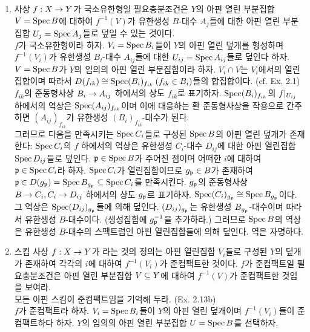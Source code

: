 	
	\begin{enumerate}[label=\tb{3.\arabic*.},itemindent=0mm,itemsep=4mm]
	\item 사상 $f:X\rightarrow Y$가 국소유한형일 필요충분조건은 $Y$의  아핀 열린 부분집합 $V=\operatorname{Spec} B$에 대하여
	$f^{-1}(V)$가 유한생성 $B$-대수 $A_j$들에 대한 아핀 열린 부분집합 $U_j=\operatorname{Spec} A_j$들로 덮일 수 있는 것이다.\\
	\sol $f$가 국소유한형이라 하자.
	$V_i=\operatorname{Spec} B_i$들이 $Y$의 아핀 열린 덮개를 형성하며 $f^{-1}(V_i)$가 유한생성 $B_i$-대수 $A_{ij}$들에 대한
	$U_{ij}=\operatorname{Spec} A_{ij}$들로 덮인다 하자. $V=\operatorname{Spec} B$가 $Y$의 임의의 아핀 열린 부분집합이라 하자.
	$V_i\cap V$는 $V_i$에서의 열린집합이며 따라서 $D(f_{ik})\cong\operatorname{Spec}(B_i)_{f_{ik}}\:(f_{ik}\in B_i)$들의 합집합이다.
	(cf. Ex. 2.1) $f_{ik}$의 준동형사상 $B_i\rightarrow A_{ij}$ 하에서의 상도 $f_{ik}$로 표기하자.
	$\operatorname{Spec}(B_i)_{f_{ik}}$의 $f|_{U_{ij}}$ 하에서의 역상은 $\operatorname{Spec}(A_{ij})_{f_{ik}}$이며
	이에 대응하는 환 준동형사상을 작용으로 간주하면 $(A_{ij})_{f_{ik}}$가 유한생성 $(B_i)_{f_{ik}}$-대수가 된다.\\
	그러므로 다음을 만족시키는 $\operatorname{Spec} C_i$들로 구성된 $\operatorname{Spec} B$의 아핀 열린 덮개가 존재한다:
	$\operatorname{Spec} C_i$의 $f$ 하에서의 역상은 유한생성 $C_i$-대수 $D_{ij}$에 대한 아핀 열린집합 $\operatorname{Spec} D_{ij}$들로 덮인다.
	$\mathfrak{p}\in\operatorname{Spec} B$가 주어진 점이며 어떠한 $i$에 대하여 $\mathfrak{p}\in\operatorname{Spec} C_i$라 하자.
	$\operatorname{Spec} C_i$가 열린집합이므로 $g_{\mathfrak{p}}\in B$가 존재하여
	$\mathfrak{p}\in D(g_{\mathfrak{p}})=\operatorname{Spec} B_{g_{\mathfrak{p}}}\subseteq\operatorname{Spec} C_i$를 만족시킨다.
	$g_{\mathfrak{p}}$의 준동형사상 $B\rightarrow C_i,C_i\rightarrow D_{ij}$ 하에서의 상도 $g_{\mathfrak{p}}$로 표기하자.
	$\operatorname{Spec}(C_i)_{g_{\mathfrak{p}}}\cong\operatorname{Spec} B_{g_{\mathfrak{p}}}$이다. 그 역상은 $\operatorname{Spec}(D_{ij})_{g_{\mathfrak{p}}}$들에 의해 덮인다.
	$(D_{ij})_{g_{\mathfrak{p}}}$는 유한생성 $B_{g_{\mathfrak{p}}}$-대수이며 따라서 유한생성 $B$-대수이다.
	(생성집합에 $g_{\mathfrak{p}}^{-1}$을 추가하라.)
	그러므로 $\operatorname{Spec} B$의 역상은 유한생성 $B$-대수의 스펙트럼인 아핀 열린집합들에 의해 덮인다. 역은 자명하다.
	\item 스킴 사상 $f:X\rightarrow Y$가 라는 것의 정의는 아핀 열린집합 $V_i$들로 구성된
	$Y$의 덮개가 존재하여 각각의 $i$에 대하여 $f^{-1}(V_i)$가 준컴팩트한 것이다.
	$f$가 준컴팩트일 필요충분조건은  아핀 열린 부분집합 $V\subseteq Y$에 대하여 $f^{-1}(V)$가 준컴팩트한 것임을 보여라.\\
	\sol 모든 아핀 스킴이 준컴팩트임을 기억해 두라. (Ex. 2.13b)\\
	$f$가 준컴팩트라 하자. $V_i=\operatorname{Spec} B_i$들이 $Y$의 아핀 열린 덮개이며 $f^{-1}(V_i)$들이 준컴팩트하다 하자.
	$Y$의 임의의 아핀 열린 부분집합 $U=\operatorname{Spec} B$를 선택하자.

\end{enumerate}
